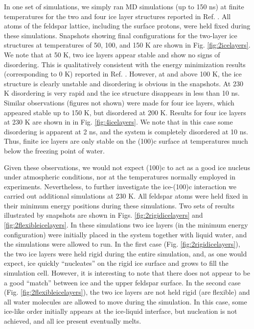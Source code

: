 \documentclass[preprint,aps,prb,floatfix]{revtex4-1}
\begin{document}
In one set of simulations, we simply ran MD simulations (up to 150 ns) at finite temperatures for the two and four ice layer structures reported in Ref. . All atoms of the feldspar lattice, including the surface protons, were held fixed during these simulations. Snapshots showing final configurations for the two-layer ice structures at temperatures of 50, 100, and 150 K are shown in Fig. \ref{fig:2icelayers}. We note that at 50 K, two ice layers appear stable and show no signs of disordering. This is qualitatively consistent with the energy minimization results (corresponding to 0 K) reported in Ref. . However, at and above 100 K, the ice structure is clearly unstable and disordering is obvious in the snapshots. At 230 K disordering is very rapid and the ice structure disappears in less than 10 ns. Similar observations (figures not shown) were made for four ice layers, which appeared stable up to 150 K, but disordered at 200 K. Results for four ice layers at 230 K are shown in in Fig. \ref{fig:4icelayers}. We note that in this case some disordering is apparent at 2 ns, and the system is completely disordered at 10 ns. Thus, finite ice layers are only stable on the (100)c surface at temperatures much below the freezing point of water.

Given these observations, we would not expect (100)c to act as a good ice nucleus under atmospheric conditions,\cite{AMWW13} nor at the temperatures normally employed in experiments.\cite{KBPC17,WHKK17} Nevertheless, to further investigate the ice-(100)c interaction we carried out additional simulations at 230 K. All feldspar atoms were held fixed in their minimum energy positions during these simulations. Two sets of results illustrated by snapshots are shown in Figs. \ref{fig:2rigidicelayers} and \ref{fig:2flexibleicelayers}. In these simulations two ice layers (in the minimum energy configuration) were initially placed in the system together with liquid water, and the simulations were allowed to run. In the first case (Fig. \ref{fig:2rigidicelayers}), the two ice layers were held rigid during the entire simulation, and, as one would expect, ice quickly ``nucleates'' on the rigid ice surface and grows to fill the simulation cell. However, it is interesting to note that there does not appear to be a good ``match'' between ice and the upper feldspar surface. In the second case (Fig. \ref{fig:2flexibleicelayers}), the two ice layers are not held rigid (are flexible) and all water molecules are allowed to move during the simulation. In this case, some ice-like order initially appears at the ice-liquid interface, but nucleation is not achieved, and all ice present eventually melts. 
\end{document}
